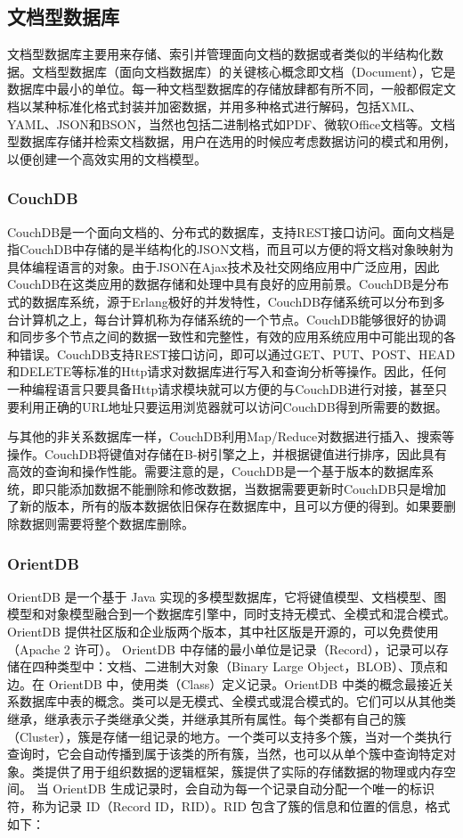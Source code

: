 \documentclass[11pt, a4paper, oneside]{ctexart}
\begin{document}
\subsection{文档型数据库}
文档型数据库主要用来存储、索引并管理面向文档的数据或者类似的半结构化数据。文档型数据库（面向文档数据库）的关键核心概念即文档（Document），它是数据库中最小的单位。每一种文档型数据库的存储放肆都有所不同，一般都假定文档以某种标准化格式封装并加密数据，并用多种格式进行解码，包括XML、YAML、JSON和BSON，当然也包括二进制格式如PDF、微软Office文档等。文档型数据库存储并检索文档数据，用户在选用的时候应考虑数据访问的模式和用例，以便创建一个高效实用的文档模型。
\subsubsection{CouchDB}
CouchDB是一个面向文档的、分布式的数据库，支持REST接口访问。面向文档是指CouchDB中存储的是半结构化的JSON文档，而且可以方便的将文档对象映射为具体编程语言的对象。由于JSON在Ajax技术及社交网络应用中广泛应用，因此CouchDB在这类应用的数据存储和处理中具有良好的应用前景。CouchDB是分布式的数据库系统，源于Erlang极好的并发特性，CouchDB存储系统可以分布到多台计算机之上，每台计算机称为存储系统的一个节点。CouchDB能够很好的协调和同步多个节点之间的数据一致性和完整性，有效的应用系统应用中可能出现的各种错误。CouchDB支持REST接口访问，即可以通过GET、PUT、POST、HEAD和DELETE等标准的Http请求对数据库进行写入和查询分析等操作。因此，任何一种编程语言只要具备Http请求模块就可以方便的与CouchDB进行对接，甚至只要利用正确的URL地址只要运用浏览器就可以访问CouchDB得到所需要的数据。

与其他的非关系数据库一样，CouchDB利用Map/Reduce对数据进行插入、搜索等操作。CouchDB将键值对存储在B-树引擎之上，并根据键值进行排序，因此具有高效的查询和操作性能。需要注意的是，CouchDB是一个基于版本的数据库系统，即只能添加数据不能删除和修改数据，当数据需要更新时CouchDB只是增加了新的版本，所有的版本数据依旧保存在数据库中，且可以方便的得到。如果要删除数据则需要将整个数据库删除。\textsuperscript{\cite{ref8}}
\subsubsection{OrientDB}
OrientDB 是一个基于 Java 实现的多模型数据库，它将键值模型、文档模型、图模型和对象模型融合到一个数据库引擎中，同时支持无模式、全模式和混合模式。OrientDB 提供社区版和企业版两个版本，其中社区版是开源的，可以免费使用（Apache 2 许可）。
OrientDB 中存储的最小单位是记录（Record），记录可以存储在四种类型中：文档、二进制大对象（Binary Large Object，BLOB）、顶点和边。在 OrientDB 中，使用类（Class）定义记录。OrientDB 中类的概念最接近关系数据库中表的概念。类可以是无模式、全模式或混合模式的。它们可以从其他类继承，继承表示子类继承父类，并继承其所有属性。每个类都有自己的簇（Cluster），簇是存储一组记录的地方。一个类可以支持多个簇，当对一个类执行查询时，它会自动传播到属于该类的所有簇，当然，也可以从单个簇中查询特定对象。类提供了用于组织数据的逻辑框架，簇提供了实际的存储数据的物理或内存空间。
当 OrientDB 生成记录时，会自动为每一个记录自动分配一个唯一的标识符，称为记录 ID（Record ID，RID）。RID 包含了簇的信息和位置的信息，格式如下：
\end{document}
